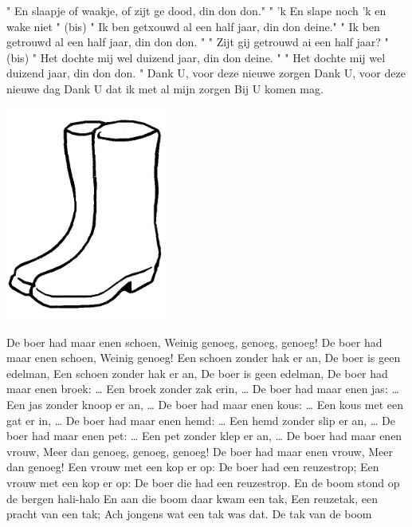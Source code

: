 \documentclass{article}
\begin{document}
\begin{songs}{}
" En slaapje of waakje, of zijt ge dood, din don don."
\endverse
\beginverse*
" 'k En slape noch 'k en wake niet " (bis)
" Ik ben getxouwd al een half jaar, din don deine."
" Ik ben getrouwd al een half jaar, din don don. "
\endverse
\beginverse*
" Zijt gij getrouwd ai een half jaar? " (bis)
" Het dochte mij wel duizend jaar, din don deine. "
" Het dochte mij wel duizend jaar, din don don. "
\endverse
\endsong
{}
\beginverse*
Dank U, voor deze nieuwe zorgen
Dank U, voor deze nieuwe dag
Dank U dat ik met al mijn zorgen
Bij U komen mag. 
\endverse
\endsong
\begin{intersong}
    \includegraphics[width=0.4\textwidth]{deboerhadmaarenenschoen}
\end{intersong}
\beginverse
De boer had maar enen schoen,
Weinig genoeg, genoeg, genoeg!
De boer had maar enen schoen,
Weinig genoeg! 
Een schoen zonder hak er an,
De boer is geen edelman,
Een schoen zonder hak er an,
De boer is geen edelman,
\endverse
\beginverse
De boer had maar enen broek: …
Een broek zonder zak erin, …
\endverse
\beginverse
De boer had maar enen jas: …
Een jas zonder knoop er an, …
\endverse
\beginverse
De boer had maar enen kous: …
Een kous met een gat er in, …
\endverse
\beginverse
De boer had maar enen hemd: …
Een hemd zonder slip er an, …
\endverse
\beginverse
De boer had maar enen pet: …
Een pet zonder klep er an, …
\endverse
\beginverse
De boer had maar enen vrouw,
Meer dan genoeg, genoeg, genoeg! 
De boer had maar enen vrouw,
Meer dan genoeg!
Een vrouw met een kop er op: 
De boer had een reuzestrop;
Een vrouw met een kop er op:
De boer die had een reuzestrop. 
\endverse
\endsong
{}
\beginchorus
En de boom stond op de bergen hali-halo 
En aan die boom daar kwam een tak,
Een reuzetak, een pracht van een tak;
Ach jongens wat een tak was dat.
De tak van de boom

\end{songs}
\end{document}
